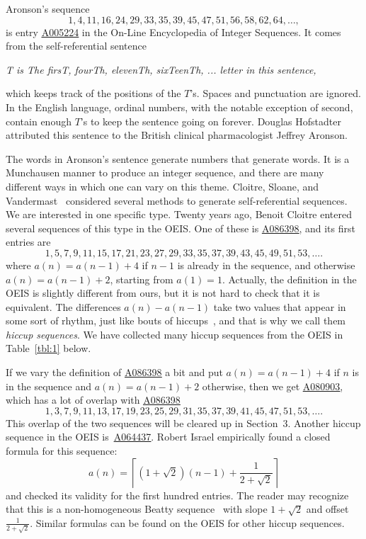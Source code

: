 \documentclass[12pt,reqno]{article}
\newcommand{\seqnum}[1]{\href{https://oeis.org/#1}{\rm \underline{#1}}}
\begin{document}

Aronson's sequence 
\[
1, 4, 11, 16, 24, 29, 33, 35, 39, 45, 47, 51, 56, 58, 62, 64, \ldots,
\]
is entry \seqnum{A005224} in the On-Line Encyclopedia of Integer Sequences.
It comes from the self-referential sentence
\begin{center}
\emph{T is The firsT, fourTh, elevenTh, sixTeenTh, ... letter in this sentence,}    
\end{center}
which keeps track of the positions of the $T$'s.
Spaces and punctuation are ignored. In the English language, ordinal numbers, with the notable exception of second,
contain enough $T$'s to keep the sentence going on forever. 
Douglas Hofstadter~\cite{hofstadter2008}
attributed this sentence to the British clinical pharmacologist Jeffrey Aronson. 

The words in Aronson's sentence generate numbers
that generate words. It is a Munchausen manner to produce an integer sequence, and
there are many different ways in which one can vary on this theme.
Cloitre, Sloane, and Vandermast~\cite{cloitre2003} considered several methods to generate self-referential sequences.
We are interested in one specific type.
Twenty years ago, Benoit Cloitre entered several sequences of this type
in the OEIS. One of these is \seqnum{A086398}, and its first entries are
\begin{equation}\label{eq:1}
1, 5, 7, 9, 11, 15, 17, 21, 23, 27, 29, 33, 35, 37, 39, 43, 45, 49, 51, 53,\ldots .
\end{equation}
where $a(n)=a(n-1)+4$ if $n-1$ is already in the sequence, and otherwise $a(n)=a(n-1)+2$,
starting from $a(1)=1$. Actually, the definition in the OEIS is slightly different from ours,
but it is not hard to check that it is equivalent. The differences 
$a(n)-a(n-1)$ take two values that appear in some sort of rhythm, just like
bouts of hiccups~\cite[p96]{hiccup}, and that is why we call them \emph{hiccup sequences}.
We have collected many hiccup sequences from the OEIS in Table~\ref{tbl:1} below.

If we vary the definition of \seqnum{A086398} a bit 
and put $a(n)=a(n-1)+4$ if $n$ is in the sequence and $a(n)=a(n-1)+2$
otherwise,
then we get \seqnum{A080903}, which has a lot of overlap with \seqnum{A086398}
\begin{equation}\label{eq:2}
1, 3, 7, 9, 11, 13, 17, 19, 23, 25, 29, 31, 35, 37, 39, 41, 45, 47, 51, 53,\ldots .
\end{equation}
This overlap of the two sequences will be cleared up in Section~3.
Another hiccup sequence in the OEIS is~\seqnum{A064437}. Robert Israel empirically found a closed formula for this sequence:
\begin{equation}\label{eq:3}
a(n)=\left\lceil\left(1+\sqrt{2}\right)(n-1)+\frac{1}{2+\sqrt{2}}\right\rceil    
\end{equation}
and checked its validity for the first hundred entries. 
The reader may recognize that this is a non-homogeneous Beatty sequence~\cite{beatty} with slope
$1+\sqrt 2$ and offset $\frac{1}{2+\sqrt{2}}$. Similar formulas can be found on the
OEIS for other hiccup sequences.
\end{document}
